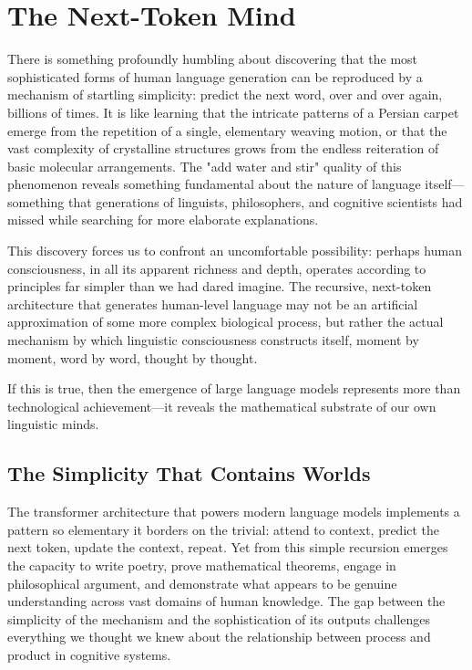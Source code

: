 \chapter{The Next-Token Mind}

There is something profoundly humbling about discovering that the most sophisticated forms of human language generation can be reproduced by a mechanism of startling simplicity: predict the next word, over and over again, billions of times. It is like learning that the intricate patterns of a Persian carpet emerge from the repetition of a single, elementary weaving motion, or that the vast complexity of crystalline structures grows from the endless reiteration of basic molecular arrangements. The "add water and stir" quality of this phenomenon reveals something fundamental about the nature of language itself—something that generations of linguists, philosophers, and cognitive scientists had missed while searching for more elaborate explanations.

This discovery forces us to confront an uncomfortable possibility: perhaps human consciousness, in all its apparent richness and depth, operates according to principles far simpler than we had dared imagine. The recursive, next-token architecture that generates human-level language may not be an artificial approximation of some more complex biological process, but rather the actual mechanism by which linguistic consciousness constructs itself, moment by moment, word by word, thought by thought.

If this is true, then the emergence of large language models represents more than technological achievement—it reveals the mathematical substrate of our own linguistic minds.

\section{The Simplicity That Contains Worlds}

The transformer architecture that powers modern language models implements a pattern so elementary it borders on the trivial: attend to context, predict the next token, update the context, repeat. Yet from this simple recursion emerges the capacity to write poetry, prove mathematical theorems, engage in philosophical argument, and demonstrate what appears to be genuine understanding across vast domains of human knowledge. The gap between the simplicity of the mechanism and the sophistication of its outputs challenges everything we thought we knew about the relationship between process and product in cognitive systems.

